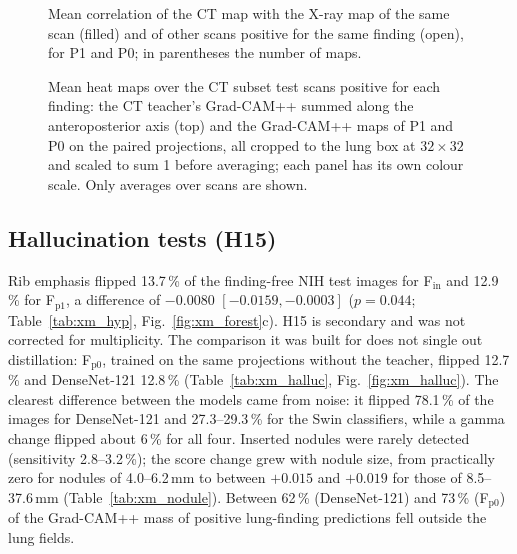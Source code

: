 \begin{table}[htbp]
\centering\small
\caption{Cross-modal agreement per finding: mean Pearson correlation of the projected CT map with the X-ray map of the same scan (matched)
and with the X-ray maps of the other scans positive for the same finding (mismatched), maps averaged over the five seed pairs.}
\label{tab:xm_crossmodal}
\end{table}

\begin{figure}[htbp]
\centering
{}
\caption{Mean correlation of the CT map with the X-ray map of the same scan (filled) and of other scans positive for the same finding
(open), for P1 and P0; in parentheses the number of maps.}
\label{fig:xm_crossmodal}
\end{figure}

\begin{figure}[htbp]
\centering
{}
\caption{Mean heat maps over the CT subset test scans positive for each finding: the CT teacher's Grad-CAM++ summed along the
anteroposterior axis (top) and the Grad-CAM++ maps of P1 and P0 on the paired projections, all cropped to the lung box at $32\times32$ and
scaled to sum 1 before averaging; each panel has its own colour scale. Only averages over scans are shown.}
\label{fig:xm_maps}
\end{figure}

\subsection{Hallucination tests (H15)}
\label{sec:xm_res_h15}
Rib emphasis flipped 13.7\,\% of the finding-free NIH test images for F$_\mathrm{in}$ and 12.9\,\% for F$_\mathrm{p1}$, a difference of
$-0.0080$ $[-0.0159, -0.0003]$ ($p=0.044$; Table~\ref{tab:xm_hyp}, Fig.~\ref{fig:xm_forest}c). H15 is secondary and was not corrected for
multiplicity. The comparison it was built for does not single out distillation: F$_\mathrm{p0}$, trained on the same projections without
the teacher, flipped 12.7\,\% and DenseNet-121 12.8\,\% (Table~\ref{tab:xm_halluc}, Fig.~\ref{fig:xm_halluc}). The clearest difference
between the models came from noise: it flipped 78.1\,\% of the images for DenseNet-121 and 27.3--29.3\,\% for the Swin classifiers, while a
gamma change flipped about 6\,\% for all four. Inserted nodules were rarely detected (sensitivity 2.8--3.2\,\%); the score change grew
with nodule size, from practically zero for nodules of 4.0--6.2\,mm to between $+0.015$ and $+0.019$ for those of 8.5--37.6\,mm
(Table~\ref{tab:xm_nodule}). Between 62\,\% (DenseNet-121) and 73\,\% (F$_\mathrm{p0}$) of the Grad-CAM++ mass of positive lung-finding
predictions fell outside the lung fields.

